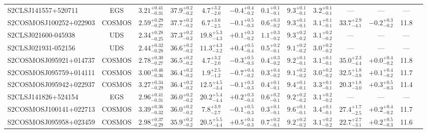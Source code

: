 \documentclass[a4paper, fleqn, usenatbib]{mnras}
\begin{document}
\begin{landscape}
\begin{table}
\begin{tabular}{l c c c c c c c c c c c c}
        S2CLSJ141557+520711 & EGS & $3.21^{+0.41}_{-0.31}$ & $37.9^{+0.2}_{-0.2}$ & $4.7^{+3.2}_{-2.0}$ & $-0.4^{+0.4}_{-0.2}$ & $0.1^{+0.1}_{-0.1}$ & $9.3^{+0.1}_{-0.1}$ & $3.2^{+0.1}_{-0.1}$ & --- & --- & ---\\
        S2COSMOSJ100252+022903 & COSMOS & $2.59^{+0.29}_{-0.27}$ & $37.7^{+0.2}_{-0.2}$ & $6.7^{+3.6}_{-2.5}$ & $-0.1^{+0.5}_{-0.3}$ & $0.6^{+0.3}_{-0.2}$ & $9.3^{+0.1}_{-0.1}$ & $3.1^{+0.1}_{-0.1}$ & $33.7^{+2.9}_{-4.1}$ & $-0.2^{+0.3}_{-0.2}$ & 11.8\\
        S2CLSJ021600-045938 & UDS & $2.34^{+0.28}_{-0.25}$ & $37.3^{+0.2}_{-0.2}$ & $19.8^{+5.3}_{-4.3}$ & $+0.1^{+0.3}_{-0.2}$ & $1.1^{+0.3}_{-0.2}$ & $9.3^{+0.2}_{-0.2}$ & $3.1^{+0.2}_{-0.2}$ & --- & --- & ---\\
        S2CLSJ021931-052156 & UDS & $2.44^{+0.32}_{-0.28}$ & $36.6^{+0.2}_{-0.2}$ & $11.3^{+4.3}_{-3.2}$ & $+0.4^{+0.5}_{-0.4}$ & $0.5^{+0.2}_{-0.1}$ & $9.1^{+0.2}_{-0.2}$ & $3.0^{+0.2}_{-0.2}$ & --- & --- & ---\\
        S2COSMOSJ095921+014737 & COSMOS & $2.78^{+0.30}_{-0.27}$ & $36.5^{+0.2}_{-0.2}$ & $4.7^{+3.2}_{-2.0}$ & $-0.3^{+0.5}_{-0.3}$ & $0.4^{+0.3}_{-0.2}$ & $9.2^{+0.1}_{-0.1}$ & $3.1^{+0.1}_{-0.1}$ & $35.0^{+2.3}_{-4.4}$ & $+0.0^{+0.4}_{-0.2}$ & 11.8\\
        S2COSMOSJ095759+014111 & COSMOS & $3.00^{+0.46}_{-0.36}$ & $36.4^{+0.2}_{-0.2}$ & $1.9^{+2.5}_{-1.2}$ & $-0.7^{+0.4}_{-0.2}$ & $0.3^{+0.4}_{-0.2}$ & $9.1^{+0.2}_{-0.2}$ & $3.0^{+0.2}_{-0.2}$ & $32.5^{+1.8}_{-3.8}$ & $+0.1^{+0.4}_{-0.2}$ & 11.7\\
        S2COSMOSJ095942+022937 & COSMOS & $3.27^{+0.34}_{-0.29}$ & $36.4^{+0.2}_{-0.2}$ & $12.5^{+4.5}_{-3.4}$ & $-0.1^{+0.3}_{-0.3}$ & $0.4^{+0.1}_{-0.1}$ & $9.4^{+0.1}_{-0.1}$ & $3.3^{+0.1}_{-0.1}$ & $20.3^{+1.8}_{-3.0}$ & $+0.3^{+0.5}_{-0.3}$ & 11.4\\
        S2CLSJ141826+524154 & EGS & $2.96^{+0.41}_{-0.31}$ & $36.0^{+0.2}_{-0.2}$ & $20.2^{+5.4}_{-4.4}$ & $+0.2^{+0.3}_{-0.3}$ & $0.6^{+0.2}_{-0.1}$ & $9.2^{+0.2}_{-0.2}$ & $3.1^{+0.2}_{-0.2}$ & --- & --- & ---\\
        S2COSMOSJ100141+022713 & COSMOS & $3.39^{+0.36}_{-0.32}$ & $36.0^{+0.2}_{-0.2}$ & $7.8^{+3.9}_{-2.7}$ & $-0.1^{+0.5}_{-0.3}$ & $0.3^{+0.1}_{-0.1}$ & $9.6^{+0.1}_{-0.1}$ & $3.4^{+0.1}_{-0.1}$ & $27.4^{+1.7}_{-2.5}$ & $+0.2^{+0.4}_{-0.2}$ & 11.7\\
        S2COSMOSJ095958+023459 & COSMOS & $2.98^{+0.37}_{-0.29}$ & $35.9^{+0.2}_{-0.2}$ & $20.5^{+5.5}_{-4.4}$ & $+0.5^{+0.4}_{-0.3}$ & $0.7^{+0.2}_{-0.1}$ & $9.2^{+0.2}_{-0.2}$ & $3.1^{+0.2}_{-0.2}$ & $22.7^{+2.7}_{-3.1}$ & $+0.2^{+0.5}_{-0.3}$ & 11.6\\

\end{tabular}
\end{table}
\end{landscape}
\end{document}
